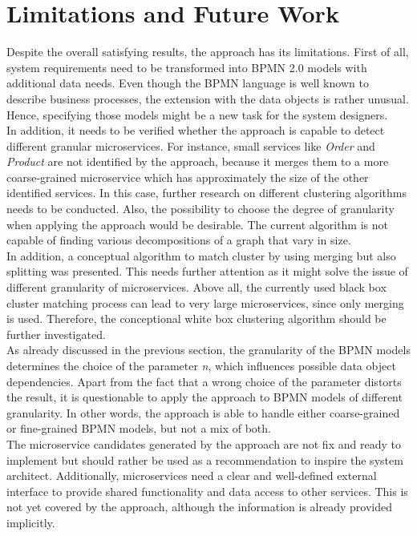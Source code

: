 \section{Limitations and Future Work}
\label{sec:Conclusion:LimitsFutureWork}
Despite the overall satisfying results, the approach has its limitations. First of all, system requirements need to be transformed into BPMN 2.0 models with additional data needs. Even though the BPMN language is well known to describe business processes, the extension with the data objects is rather unusual. Hence, specifying those models might be a new task for the system designers.  \\
In addition, it needs to be verified whether the approach is capable to detect different granular microservices. For instance, small services like \textit{Order} and \textit{Product} are not identified by the approach, because it merges them to a more coarse-grained microservice which has approximately the size of the other identified services. In this case, further research on different clustering algorithms needs to be conducted. Also, the possibility to choose the degree of granularity when applying the approach would be desirable. The current algorithm is not capable of finding various decompositions of a graph that vary in size. \\
In addition, a conceptual algorithm to match cluster by using merging but also splitting was presented. This needs further attention as it might solve the issue of different granularity of microservices.  Above all, the currently used black box cluster matching process can lead to very large microservices, since only merging is used. Therefore, the conceptional white box clustering algorithm should be further investigated. \\
As already discussed in the previous section, the granularity of the BPMN models determines the choice of the parameter \textit{n}, which influences possible data object dependencies. 
Apart from the fact that a wrong choice of the parameter distorts the result, it is questionable to apply the approach to BPMN models of different granularity. In other words, the approach is able to handle either coarse-grained or fine-grained BPMN models, but not a mix of both. \\
The microservice candidates generated by the approach are not fix and ready to implement but should rather be used as a recommendation to inspire the system architect. Additionally, microservices need a clear and well-defined external interface to provide shared functionality and data access to other services. This is not yet covered by the approach, although the information is already provided implicitly. 



